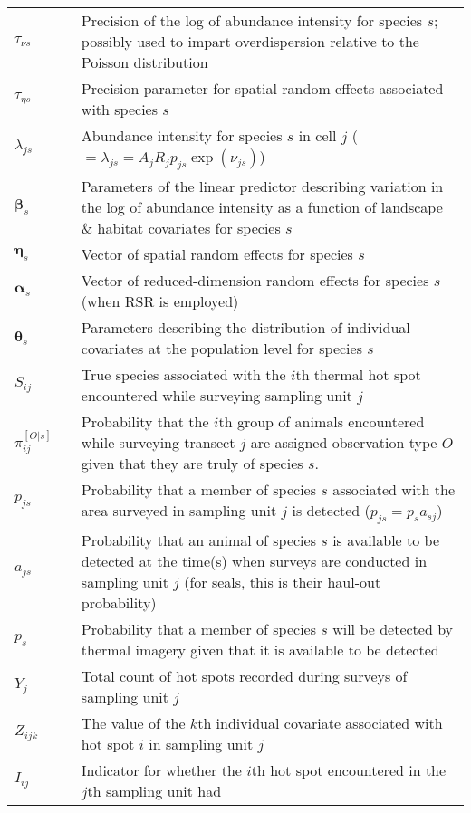 \documentclass[12pt,fleqn]{article}
\begin{document}
\begin{flushleft}
\begin{longtable}{p{1.5cm}l p{14cm}}
$\tau_{\nu s}$ & & Precision of the log of abundance intensity for species $s$; possibly used to impart overdispersion relative to the Poisson distribution \\
$\tau_{\eta s}$ & & Precision parameter for spatial random effects associated with species $s$\\
$\lambda_{js}$ & & Abundance intensity for species $s$ in cell $j$ ($=\lambda_{js}=A_j R_j p_{js} \exp(\nu_{js})$)\\
$\boldsymbol{\beta}_s$ & & Parameters of the linear predictor describing variation in
        the log of abundance intensity as a function of landscape \& habitat covariates for species $s$\\
$\boldsymbol{\eta}_s$ & & Vector of spatial random effects for species $s$ \\
$\boldsymbol{\alpha}_s$ & & Vector of reduced-dimension random effects for species $s$ (when RSR is employed)\\
$\boldsymbol{\theta}_s$ & & Parameters describing the distribution of individual covariates
                          at the population level for species $s$ \\
$S_{ij}$ & & True species associated with the $i$th thermal hot spot encountered while surveying sampling unit $j$ \\
$\pi_{ij}^{[O|s]}$ & & Probability that the $i$th group of animals encountered while surveying transect $j$ are assigned observation type $O$ given that they are truly of species $s$.  \\
$p_{js}$ & & Probability that a member of species $s$ associated with the area surveyed in sampling
    unit $j$ is detected ($p_{js}=p_s a_{sj}$)\\
$a_{js}$ & & Probability that an animal of species $s$ is available to be detected at the time(s)
    when surveys are conducted in sampling unit $j$ (for seals, this is their haul-out probability)\\
$p_s$ & & Probability that a member of species $s$ will be detected by thermal imagery given that
          it is available to be detected \\
$Y_{j}$ & & Total count of hot spots recorded during surveys of sampling unit $j$\\
$Z_{ijk}$   & &  The value of the $k$th individual covariate associated with hot spot $i$
                in sampling unit $j$\\
$I_{ij}$  & & Indicator for whether the $i$th hot spot encountered in the $j$th sampling unit had

\end{longtable}
\end{flushleft}
\end{document}
